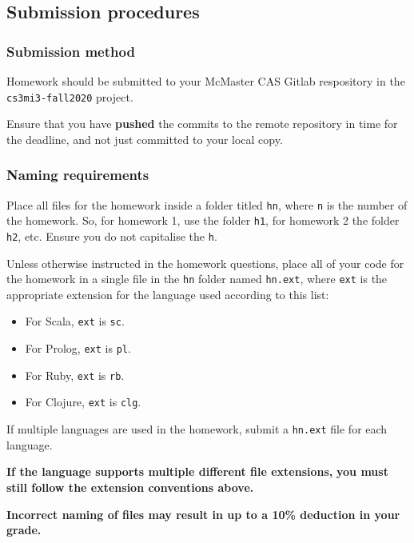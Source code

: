 \documentclass[11pt]{article}
\begin{document}
\subsection*{Submission procedures}
\label{sec:orgb0933ac}
\subsubsection*{Submission method}
\label{sec:org135d092}

Homework should be submitted to your McMaster CAS Gitlab respository
in the \texttt{cs3mi3-fall2020} project.

Ensure that you have \textbf{pushed} the commits to the remote repository
in time for the deadline, and not just committed to your local copy.

\subsubsection*{Naming requirements}
\label{sec:org23af7fa}

Place all files for the homework
inside a folder titled \texttt{hn}, where \texttt{n} is the number of the homework.
So, for homework 1, use the folder \texttt{h1}, for homework 2 the folder \texttt{h2}, etc.
Ensure you do not capitalise the \texttt{h}.

Unless otherwise instructed in the homework questions,
place all of your code for the homework
in a single file in the \texttt{hn} folder named \texttt{hn.ext},
where \texttt{ext} is the appropriate extension for the language used
according to this list:
\begin{itemize}
\item For Scala, \texttt{ext} is \texttt{sc}.
\item For Prolog, \texttt{ext} is \texttt{pl}.
\item For Ruby, \texttt{ext} is \texttt{rb}.
\item For Clojure, \texttt{ext} is \texttt{clg}.
\end{itemize}
If multiple languages are used in the homework,
submit a \texttt{hn.ext} file for each language.

\begin{center}
\textbf{If the language supports multiple different file extensions,}
\textbf{you must still follow the extension conventions above.}
\end{center}

\begin{center}
\textbf{Incorrect naming of files may result in up to a 10\% deduction in your grade.}
\end{center}
\end{document}
